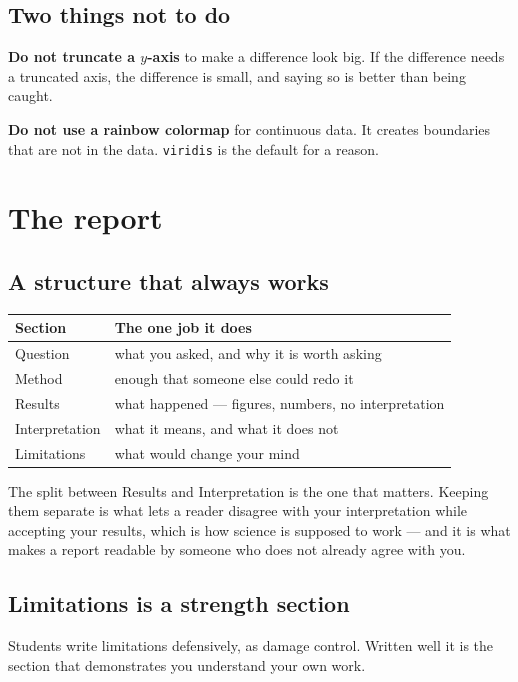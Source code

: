 \documentclass[11pt]{article}
\begin{document}
\subsection{Two things not to do}

\textbf{Do not truncate a $y$-axis} to make a difference look big. If the
difference needs a truncated axis, the difference is small, and saying so is
better than being caught.

\textbf{Do not use a rainbow colormap} for continuous data. It creates
boundaries that are not in the data. \texttt{viridis} is the default for a
reason.

\section{The report}

\subsection{A structure that always works}

\begin{center}
\begin{tabular}{@{}ll@{}}
\toprule
Section & The one job it does \\
\midrule
Question & what you asked, and why it is worth asking \\
Method & enough that someone else could redo it \\
Results & what happened --- figures, numbers, no interpretation \\
Interpretation & what it means, and what it does not \\
Limitations & what would change your mind \\
\bottomrule
\end{tabular}
\end{center}

The split between Results and Interpretation is the one that matters. Keeping
them separate is what lets a reader disagree with your interpretation while
accepting your results, which is how science is supposed to work --- and it is
what makes a report readable by someone who does not already agree with you.

\subsection{Limitations is a strength section}

Students write limitations defensively, as damage control. Written well it is
the section that demonstrates you understand your own work.
\end{document}
